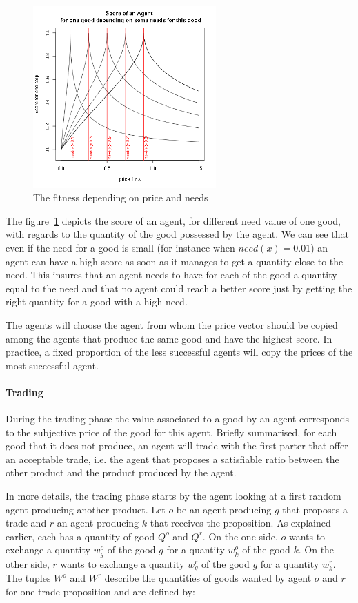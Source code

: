\documentclass{wscpaperproc}
\begin{document}
\begin{figure}[htp]
	\begin{center}
		\includegraphics[width=7cm]{img/fitness.png}
	\end{center}
	\caption{The fitness depending on price and needs}
	\label{fig:fit}
\end{figure}
The figure~\ref{fig:fit} depicts the score of an agent, for different need value of one good, with regards to the quantity of the good possessed by the agent. We can see that even if the need for a good is small (for instance when $need(x) = 0.01$) an agent can have a high score as soon as it manages to get a quantity close to the need. This insures that an agent needs to have for each of the good a quantity equal to the need and that no agent could reach a better score just by getting the right quantity for a good with a high need.

The agents will choose the agent from whom the price vector should be copied among the agents that produce the same good and have the highest score. In practice, a fixed proportion of the less successful agents will copy the prices of the most successful agent. 


\paragraph{Trading} 
During the trading phase the value associated to a good by an agent corresponds to the subjective price of the good for this agent. Briefly summarised, for each good that it does not produce, an agent will trade with the first parter that offer an acceptable trade, i.e. the agent that proposes a satisfiable ratio between the other product and the product produced by the agent. 

In more details, the trading phase starts by the agent looking at a first random agent producing another product. 
Let $o$ be an agent producing $g$ that proposes a trade and $r$ an agent producing $k$ that receives the proposition. As explained earlier, each has a quantity of good $Q^o$ and $Q^r$. On the one side, $o$ wants to exchange a quantity $w_g^o$ of the good $g$ for a quantity $w_k^o$ of the good $k$. On the other side, $r$ wants to exchange a quantity $w_g^r$ of the good $g$ for a quantity $w_k^r$. The tuples $W^o$ and $W^r$ describe the quantities of goods wanted by agent $o$ and $r$ for one trade proposition and are defined by:  
\end{document}
